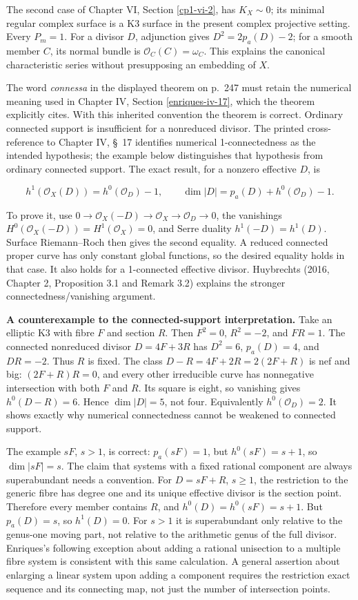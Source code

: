The second case of Chapter VI, Section \ref{cp1-vi-2}, has \(K_X\sim0\); its minimal regular complex surface is a K3 surface in the present complex projective setting. Every \(P_m=1\). For a divisor \(D\), adjunction gives \(D^2=2p_a(D)-2\); for a smooth member \(C\), its normal bundle is \(\mathcal O_C(C)=\omega_C\). This explains the canonical characteristic series without presupposing an embedding of \(X\).

The word \emph{connessa} in the displayed theorem on p.~247 must retain the numerical meaning used in Chapter IV, Section \ref{enriques-iv-17}, which the theorem explicitly cites. With this inherited convention the theorem is correct. Ordinary connected support is insufficient for a nonreduced divisor. The printed cross-reference to Chapter IV, \S~17 identifies numerical 1-connectedness as the intended hypothesis; the example below distinguishes that hypothesis from ordinary connected support. The exact result, for a nonzero effective \(D\), is

\[
h^1(\mathcal O_X(D))=h^0(\mathcal O_D)-1,
\qquad
\dim\vert D\vert =p_a(D)+h^0(\mathcal O_D)-1.
\]

To prove it, use \(0\to\mathcal O_X(-D)\to\mathcal O_X\to\mathcal O_D\to0\), the vanishings \(H^0(\mathcal O_X(-D))=H^1(\mathcal O_X)=0\), and Serre duality \(h^1(-D)=h^1(D)\). Surface Riemann--Roch then gives the second equality. A reduced connected proper curve has only constant global functions, so the desired equality holds in that case. It also holds for a 1-connected effective divisor. Huybrechts (2016, Chapter 2, Proposition 3.1 and Remark 3.2) explains the stronger connectedness/vanishing argument.

\textbf{A counterexample to the connected-support interpretation.} Take an elliptic K3 with fibre \(F\) and section \(R\). Then \(F^2=0\), \(R^2=-2\), and \(FR=1\). The connected nonreduced divisor \(D=4F+3R\) has \(D^2=6\), \(p_a(D)=4\), and \(DR=-2\). Thus \(R\) is fixed. The class \(D-R=4F+2R=2(2F+R)\) is nef and big: \((2F+R)R=0\), and every other irreducible curve has nonnegative intersection with both \(F\) and \(R\). Its square is eight, so vanishing gives \(h^0(D-R)=6\). Hence \(\dim\vert D\vert =5\), not four. Equivalently \(h^0(\mathcal O_D)=2\). It shows exactly why numerical connectedness cannot be weakened to connected support.

The example \(sF\), \(s>1\), is correct: \(p_a(sF)=1\), but \(h^0(sF)=s+1\), so \(\dim\vert sF\vert =s\). The claim that systems with a fixed rational component are always superabundant needs a convention. For \(D=sF+R\), \(s\ge1\), the restriction to the generic fibre has degree one and its unique effective divisor is the section point. Therefore every member contains \(R\), and \(h^0(D)=h^0(sF)=s+1\). But \(p_a(D)=s\), so \(h^1(D)=0\). For \(s>1\) it is superabundant only relative to the genus-one moving part, not relative to the arithmetic genus of the full divisor. Enriques's following exception about adding a rational unisection to a multiple fibre system is consistent with this same calculation. A general assertion about enlarging a linear system upon adding a component requires the restriction exact sequence and its connecting map, not just the number of intersection points.

